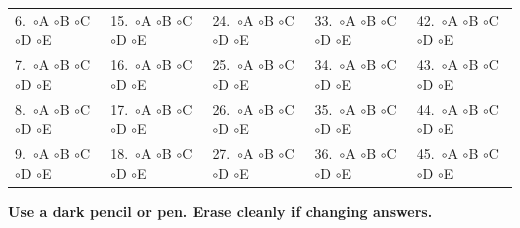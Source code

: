 \documentclass[12pt]{article}
\newcommand{\bubble}{\Large$\circ$}
\begin{document}
\begin{center}
\begin{tabular}{lllll}
6.\ \bubble A \bubble B \bubble C \bubble D \bubble E &
15.\ \bubble A \bubble B \bubble C \bubble D \bubble E &
24.\ \bubble A \bubble B \bubble C \bubble D \bubble E &
33.\ \bubble A \bubble B \bubble C \bubble D \bubble E &
42.\ \bubble A \bubble B \bubble C \bubble D \bubble E \\

7.\ \bubble A \bubble B \bubble C \bubble D \bubble E &
16.\ \bubble A \bubble B \bubble C \bubble D \bubble E &
25.\ \bubble A \bubble B \bubble C \bubble D \bubble E &
34.\ \bubble A \bubble B \bubble C \bubble D \bubble E &
43.\ \bubble A \bubble B \bubble C \bubble D \bubble E \\

8.\ \bubble A \bubble B \bubble C \bubble D \bubble E &
17.\ \bubble A \bubble B \bubble C \bubble D \bubble E &
26.\ \bubble A \bubble B \bubble C \bubble D \bubble E &
35.\ \bubble A \bubble B \bubble C \bubble D \bubble E &
44.\ \bubble A \bubble B \bubble C \bubble D \bubble E \\

9.\ \bubble A \bubble B \bubble C \bubble D \bubble E &
18.\ \bubble A \bubble B \bubble C \bubble D \bubble E &
27.\ \bubble A \bubble B \bubble C \bubble D \bubble E &
36.\ \bubble A \bubble B \bubble C \bubble D \bubble E &
45.\ \bubble A \bubble B \bubble C \bubble D \bubble E \\
\end{tabular}
\end{center}

\vfill
\textbf{Use a dark pencil or pen. Erase cleanly if changing answers.}
\end{document}
